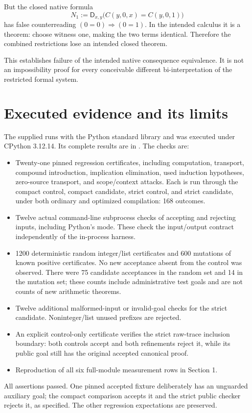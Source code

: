 \documentclass[11pt,letterpaper]{article}
\theoremstyle{definition}
\newcommand{\D}{\mathsf D}
\newcommand{\file}[1]{\texttt{\detokenize{#1}}}
\begin{document}
But the closed native formula
\[
 N_1:=\D_{x,y}\bigl(C(y,0,x)=C(y,0,1)\bigr)
\]
has false counterreading $(0=0)\Rightarrow(0=1)$. In the intended calculus
it is a theorem: choose witness one, making the two terms identical.
Therefore the combined restrictions lose an intended closed theorem.

This establishes failure of the intended native consequence equivalence.
It is not an impossibility proof for every conceivable different
bi-interpretation of the restricted formal system.

\section{Executed evidence and its limits}
The supplied \file{reproduce.py} runs with the Python standard library and
was executed under CPython 3.12.14. Its complete results are in
\file{evidence/results.json}. The checks are:
\begin{itemize}
\item Twenty-one pinned regression certificates, including computation,
transport, compound introduction, implication elimination, used induction
hypotheses, zero-source transport, and scope/context attacks. Each is run
through the compact control, compact candidate, strict control, and strict
candidate, under both ordinary and optimized compilation: 168 outcomes.
\item Twelve actual command-line subprocess checks of accepting and rejecting
inputs, including Python's \file{-O} mode. These check the input/output
contract independently of the in-process harness.
\item 1200 deterministic random integer/list certificates and 600 mutations
of known positive certificates. No new acceptance absent from the control
was observed. There were 75 candidate acceptances in the random set and
14 in the mutation set; these counts include administrative test goals and
are not counts of new arithmetic theorems.
\item Twelve additional malformed-input or invalid-goal checks for the
strict candidate. Noninteger/list unused prefixes are rejected.
\item An explicit control-only certificate verifies the strict raw-trace
inclusion boundary: both controls accept and both refinements reject it,
while its public goal still has the original accepted canonical proof.
\item Reproduction of all six full-module measurement rows in Section 1.
\end{itemize}
All assertions passed. One pinned accepted fixture deliberately has an
unguarded auxiliary goal; the compact comparison accepts it and the strict
public checker rejects it, as specified. The other regression expectations
are preserved.
\end{document}
